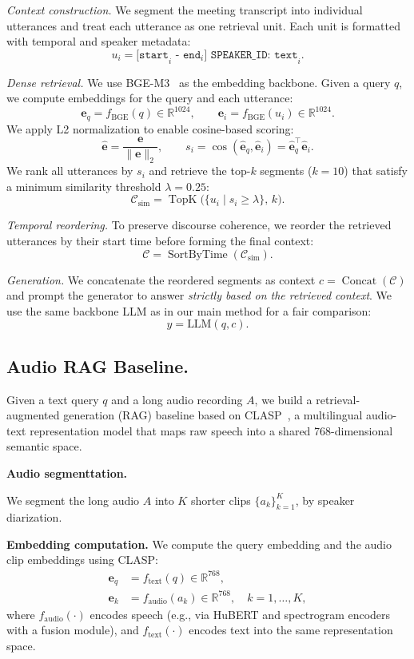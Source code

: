 \documentclass[11pt]{article}
\begin{document}
\textit{Context construction.} We segment the meeting transcript into individual utterances and treat each utterance as one retrieval unit. Each unit is formatted with temporal and speaker metadata:
\[
u_i=\texttt{[start}_i\texttt{ - end}_i \texttt{] SPEAKER\_ID: text}_i.
\]

\textit{Dense retrieval.} We use BGE-M3~\cite{chen2024bgem3embeddingmultilingualmultifunctionality} as the embedding backbone. Given a query $q$, we compute embeddings for the query and each utterance:
\[
\mathbf{e}_q=f_{\text{BGE}}(q) \in \mathbb{R}^{1024},\qquad \mathbf{e}_i=f_{\text{BGE}}(u_i) \in \mathbb{R}^{1024}.
\]
We apply L2 normalization to enable cosine-based scoring:
\[
\hat{\mathbf{e}}=\frac{\mathbf{e}}{\lVert \mathbf{e}\rVert_2},\qquad
s_i=\cos(\hat{\mathbf{e}}_q,\hat{\mathbf{e}}_i)=\hat{\mathbf{e}}_q^\top \hat{\mathbf{e}}_i.
\]
We rank all utterances by $s_i$ and retrieve the top-$k$ segments ($k=10$) that satisfy a minimum similarity threshold $\lambda=0.25$:
\[
\mathcal{C}_{\text{sim}}=\operatorname{TopK}\Big(\{u_i \mid s_i\ge\lambda\},\,k\Big).
\]

\textit{Temporal reordering.} To preserve discourse coherence, we reorder the retrieved utterances by their start time before forming the final context:
\[
\mathcal{C}=\operatorname{SortByTime}(\mathcal{C}_{\text{sim}}).
\]

\textit{Generation.} We concatenate the reordered segments as context $c=\operatorname{Concat}(\mathcal{C})$ and prompt the generator to answer \emph{strictly based on the retrieved context}. We use the same backbone LLM as in our main method for a fair comparison:
\[
y=\text{LLM}(q,c).
\]

\subsection{Audio RAG Baseline.}
Given a text query $q$ and a long audio recording $A$, we build a retrieval-augmented generation (RAG) baseline based on CLASP~\cite{CLASP}, a multilingual audio-text representation model that maps raw speech into a shared 768-dimensional semantic space.

\textbf{Audio segmenttation.}

We segment the long audio $A$ into $K$ shorter clips $\{a_k\}_{k=1}^{K}$, by speaker diarization.

\textbf{Embedding computation.}
We compute the query embedding and the audio clip embeddings using CLASP:
\begin{align}
\mathbf{e}_q &= f_{\text{text}}(q) \in \mathbb{R}^{768}, \\
\mathbf{e}_k &= f_{\text{audio}}(a_k) \in \mathbb{R}^{768}, \quad k=1,\dots,K,
\end{align}
where $f_{\text{audio}}(\cdot)$ encodes speech (e.g., via HuBERT and spectrogram encoders with a fusion module), and $f_{\text{text}}(\cdot)$ encodes text into the same representation space.
\end{document}
